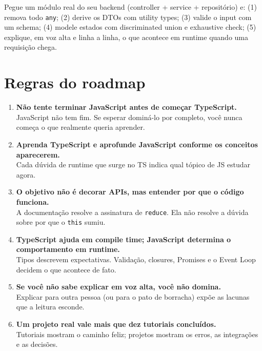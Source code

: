\documentclass[12pt,a4paper,oneside]{book}
\newcommand{\code}[1]{\texttt{#1}}
\begin{document}
\begin{nota}
Pegue um módulo real do seu backend (controller + service + repositório) e: (1) remova todo \code{any}; (2) derive os DTOs com utility types; (3) valide o input com um schema; (4) modele estados com discriminated union e exhaustive check; (5) explique, em voz alta e linha a linha, o que acontece em runtime quando uma requisição chega.
\end{nota}

\chapter{Regras do roadmap}

\begin{enumerate}
  \item \textbf{Não tente terminar JavaScript antes de começar TypeScript.}\\
  JavaScript não tem fim. Se esperar dominá-lo por completo, você nunca começa o que realmente queria aprender.

  \item \textbf{Aprenda TypeScript e aprofunde JavaScript conforme os conceitos aparecerem.}\\
  Cada dúvida de runtime que surge no TS indica qual tópico de JS estudar agora.

  \item \textbf{O objetivo não é decorar APIs, mas entender por que o código funciona.}\\
  A documentação resolve a assinatura de \code{reduce}. Ela não resolve a dúvida sobre por que o \code{this} sumiu.

  \item \textbf{TypeScript ajuda em compile time; JavaScript determina o comportamento em runtime.}\\
  Tipos descrevem expectativas. Validação, closures, Promises e o Event Loop decidem o que acontece de fato.

  \item \textbf{Se você não sabe explicar em voz alta, você não domina.}\\
  Explicar para outra pessoa (ou para o pato de borracha) expõe as lacunas que a leitura esconde.

  \item \textbf{Um projeto real vale mais que dez tutoriais concluídos.}\\
  Tutoriais mostram o caminho feliz; projetos mostram os erros, as integrações e as decisões.
\end{enumerate}
\end{document}
